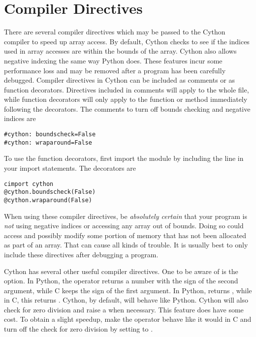 \section*{Compiler Directives}
There are several compiler directives which may be passed to the Cython compiler to speed up array access.
By default, Cython checks to see if the indices used in array accesses are within the bounds of the array.
Cython also allows negative indexing the same way Python does.
These features incur some performance loss and may be removed after a program has been carefully debugged.
Compiler directives in Cython can be included as comments or as function decorators.
Directives included in comments will apply to the whole file, while function decorators will only apply to the function or method immediately following the decorators.
The comments to turn off bounds checking and negative indices are
\begin{lstlisting}
#cython: boundscheck=False
#cython: wraparound=False
\end{lstlisting}
To use the function decorators, first import the  module by including the line  in your import statements.
The decorators are
\begin{lstlisting}
cimport cython
@cython.boundscheck(False)
@cython.wraparound(False)
\end{lstlisting}
When using these compiler directives, be \emph{absolutely certain} that your program is \emph{not} using negative indices or accessing any array out of bounds.
Doing so could access and possibly modify some portion of memory that has not been allocated as part of an array.
That can cause all kinds of trouble.
It is usually best to only include these directives after debugging a program.

Cython has several other useful compiler directives.
One to be aware of is the  option.
In Python, the \li{\%} operator returns a number with the sign of the second argument, while C keeps the sign of the first argument.
In Python,  returns , while in C, this returns .
Cython, by default, will behave like Python.
Cython will also check for zero division and raise a  when necessary.
This feature does have some cost. To obtain a slight speedup, make the \li{\%} operator behave like it would in C and turn off the check for zero division by setting  to .

